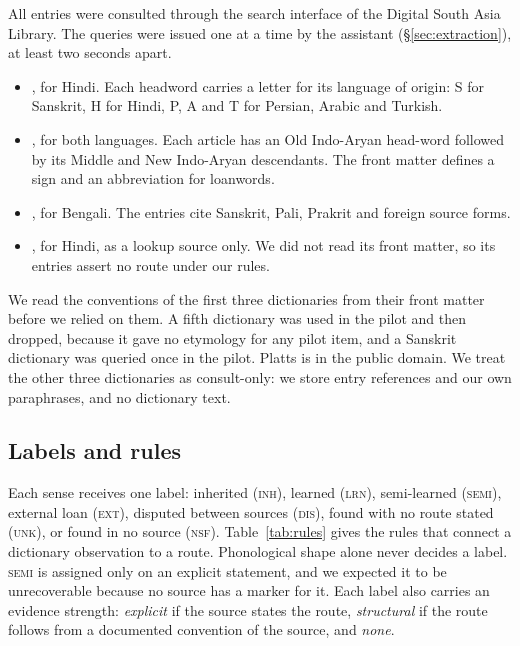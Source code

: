 \documentclass[11pt]{article}
\newcommand{\lbl}[1]{\textsc{#1}}
\begin{document}
All entries were consulted through the search interface of the Digital South Asia Library. The queries were issued one at a time by the assistant (\S\ref{sec:extraction}), at least two seconds apart.
\begin{itemize}
\item \textbf{\citet{platts1884}}, for Hindi. Each headword carries a letter for its language of origin: S for Sanskrit, H for Hindi, P, A and T for Persian, Arabic and Turkish.
\item \textbf{\citet{turner1966cdial}}, for both languages. Each article has an Old Indo-Aryan head-word followed by its Middle and New Indo-Aryan descendants. The front matter defines a sign and an abbreviation for loanwords.
\item \textbf{\citet{dasa1937bangala}}, for Bengali. The entries cite Sanskrit, Pali, Prakrit and foreign source forms.
\item \textbf{\citet{dasa1975sabdasagara}}, for Hindi, as a lookup source only. We did not read its front matter, so its entries assert no route under our rules.
\end{itemize}
We read the conventions of the first three dictionaries from their front matter before we relied on them. A fifth dictionary was used in the pilot and then dropped, because it gave no etymology for any pilot item, and a Sanskrit dictionary was queried once in the pilot. Platts is in the public domain. We treat the other three dictionaries as consult-only: we store entry references and our own paraphrases, and no dictionary text.

\subsection{Labels and rules}

Each sense receives one label: inherited (\lbl{inh}), learned (\lbl{lrn}), semi-learned (\lbl{semi}), external loan (\lbl{ext}), disputed between sources (\lbl{dis}), found with no route stated (\lbl{unk}), or found in no source (\lbl{nsf}). Table~\ref{tab:rules} gives the rules that connect a dictionary observation to a route. Phonological shape alone never decides a label. \lbl{semi} is assigned only on an explicit statement, and we expected it to be unrecoverable because no source has a marker for it. Each label also carries an evidence strength: \textit{explicit} if the source states the route, \textit{structural} if the route follows from a documented convention of the source, and \textit{none}.
\end{document}

